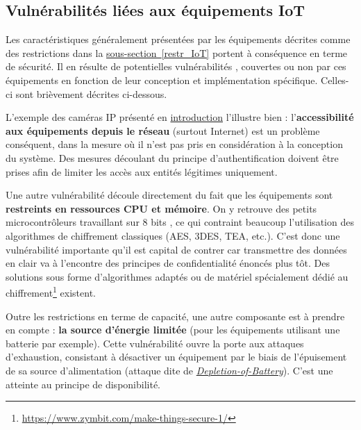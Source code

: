 \documentclass[]{article}
\newcommand{\minit}[1]{\noindent{\small\textbf{ \underline{#1}}}\vspace{0.2cm}}
\newcommand{\wordlink}[2]{\hyperref[#1]{#2~\ref{#1}}}
\begin{document}


\newpage

\subsection{Vulnérabilités liées aux équipements IoT}\label{vuln_IoT}

\par Les caractéristiques généralement présentées par les équipements décrites comme des restrictions dans la \wordlink{restr_IoT}{sous-section} portent à conséquence en terme de sécurité. Il en résulte de potentielles vulnérabilités \cite{Huichen2016}, couvertes ou non par ces équipements en fonction de leur conception et implémentation spécifique. Celles-ci sont brièvement décrites ci-dessous.\\

\par L'exemple des caméras IP présenté en \hyperref[motiv_IoT]{introduction} l'illustre bien : l'\textbf{accessibilité aux équipements depuis le réseau} (surtout Internet) est un problème conséquent, dans la mesure où il n'est pas pris en considération à la conception du système. Des mesures découlant du principe d'authentification doivent être prises afin de limiter les accès aux entités légitimes uniquement.\\

\par Une autre vulnérabilité découle directement du fait que les équipements sont \textbf{restreints en ressources CPU et mémoire}. On y retrouve des petits microcontrôleurs travaillant sur 8 bits \cite{Huichen2016}, ce qui contraint beaucoup l'utilisation des algorithmes de chiffrement classiques (AES, 3DES, TEA, etc.). C'est donc une vulnérabilité importante qu'il est capital de contrer car transmettre des données en clair va à l'encontre des principes de confidentialité énoncés plus tôt. Des solutions sous forme d'algorithmes adaptés \cite{Batra2016} ou de matériel spécialement dédié au chiffrement\footnote{\url{https://www.zymbit.com/make-things-secure-1/}} existent.\\

\par Outre les restrictions en terme de capacité, une autre composante est à prendre en compte : \textbf{la source d'énergie limitée} (pour les équipements utilisant une batterie par exemple). Cette vulnérabilité ouvre la porte aux attaques d'exhaustion, consistant à désactiver un équipement par le biais de l'épuisement de sa source d'alimentation \cite{Makhdoom2018} (attaque dite de \href{https://www.ncbi.nlm.nih.gov/pmc/articles/PMC6021927/}{\textit{Depletion-of-Battery}}). C'est une atteinte au principe de disponibilité.\\
\end{document}
